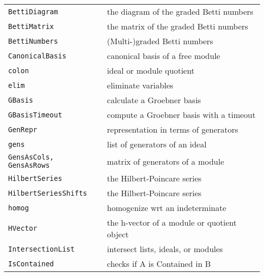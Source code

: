 \documentclass[a4paper]{mybook}
\begin{document}
\begin{center}
\begin{longtable}{ll}
   
{\verb~BettiDiagram~} &
      the diagram of the graded Betti numbers\\
   
{\verb~BettiMatrix~} &
      the matrix of the graded Betti numbers\\
   
{\verb~BettiNumbers~} &
      (Multi-)graded Betti numbers\\
   
{\verb~CanonicalBasis~} &
      canonical basis of a free module\\
   
{\verb~colon~} &
      ideal or module quotient\\
   
{\verb~elim~} &
      eliminate variables\\
   
{\verb~GBasis~} &
      calculate a Groebner basis\\
   
{\verb~GBasisTimeout~} &
      compute a Groebner basis with a timeout\\
   
{\verb~GenRepr~} &
      representation in terms of generators\\
   
{\verb~gens~} &
      list of generators of an ideal\\
   
{\verb~GensAsCols, GensAsRows~} &
      matrix of generators of a module\\
   
{\verb~HilbertSeries~} &
      the Hilbert-Poincare series\\
   
{\verb~HilbertSeriesShifts~} &
      the Hilbert-Poincare series\\
   
{\verb~homog~} &
      homogenize wrt an indeterminate\\
   
{\verb~HVector~} &
      the h-vector of a module or quotient object\\
   
{\verb~IntersectionList~} &
      intersect lists, ideals, or modules\\
   
{\verb~IsContained~} &
      checks if A is Contained in B\\
   

\end{longtable}
\end{center}
\end{document}
